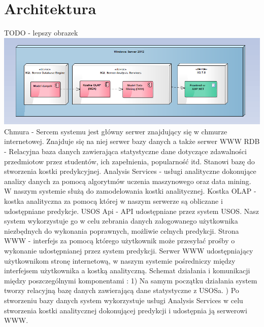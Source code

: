 \documentclass[licencjacka]{pracamgr}
\begin{document}
 \chapter{Architektura}
TODO - lepszy obrazek \newline
 \includegraphics[scale=0.6]{Architektura.png}\newline
Chmura - Sercem systemu jest główny serwer znajdujący się w chmurze internetowej. Znajduje się na niej serwer bazy danych a także serwer WWW \newline
RDB - Relacyjna baza danych zawierająca statystyczne dane dotyczące zdawalności przedmiotow przez studentów, ich zapełnienia, popularność itd. Stanowi bazę do stworzenia kostki predykcyjnej. \newline
Analysis Services - usługi analityczne dokonujące analizy danych za pomocą algorytmów uczenia maszynowego oraz data mining. W naszym systemie służą do zamodelowania kostki analitycznej. \newline
Kostka OLAP -  kostka analityczna za pomocą której w naszym serwerze są obliczane i udostępniane predykcje. \newline
USOS Api - API udostępniane przez system USOS. Nasz system wykorzystuje go w celu zebrania danych zalogowanego użytkownika niezbędnych do wykonania poprawnych, możliwie celnych predykcji. \newline
Strona WWW - interfejs za pomocą którego użytkownik może przesyłać prośby o wykonanie udostępnianej przez system predykcji. \newline
Serwer WWW udostępniający użytkownikom stronę internetową, w naszym systemie pośredniczy między interfejsem użytkownika a kostką analityczną.  \newline
\newpage
Schemat działania i komunikacji między poszczególnymi komponentami :
1) Na samym początku działania system tworzy relacyjną bazę danych zawierającą dane statystyczne z USOSa. ) Po stworzeniu bazy danych system wykorzystuje usługi Analysis Services w celu stworzenia kostki analitycznej dokonującej predykcji i udostępnia ją serwerowi WWW. \newline
\end{document}
